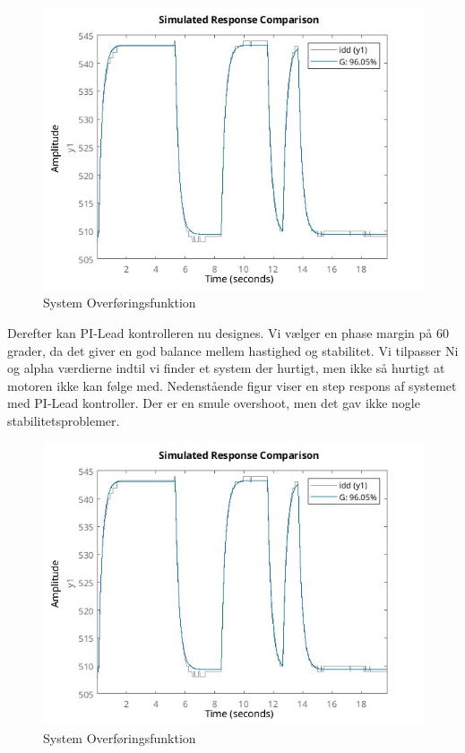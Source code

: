 \documentclass[../main.tex]{subfiles}
\begin{document}
\begin{figure}[H]
      \includegraphics[width=\textwidth]{Dokumentation/Motor Model Fit.jpg}
     \caption{System Overføringsfunktion}
     \label{fig: System Overføringsfunktion}
     \end{figure}

Derefter kan PI-Lead kontrolleren nu designes. Vi vælger en phase margin på 60 grader, da det giver en god balance mellem hastighed og stabilitet. Vi tilpasser Ni og alpha værdierne indtil vi finder et system der hurtigt, men ikke så hurtigt at motoren ikke kan følge med. Nedenstående figur viser en step respons af systemet med PI-Lead kontroller. Der er en smule overshoot, men det gav ikke nogle stabilitetsproblemer.

\begin{figure}[H]
      \includegraphics[width=\textwidth]{Dokumentation/Motor Model Fit.jpg}
     \caption{System Overføringsfunktion}
     \label{fig: System Overføringsfunktion}
     \end{figure}
\end{document}
